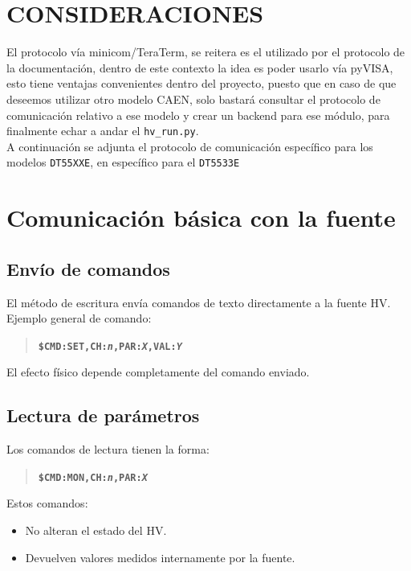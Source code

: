 \documentclass{article}
\begin{document}
\section{CONSIDERACIONES}

El protocolo vía minicom/TeraTerm, se reitera es el utilizado por el protocolo de la documentación, dentro de este contexto la idea es poder usarlo vía pyVISA, esto tiene ventajas convenientes dentro del proyecto, puesto que en caso de que deseemos utilizar otro modelo CAEN, solo bastará consultar el protocolo de comunicación relativo a ese modelo y crear un backend para ese módulo, para finalmente echar a andar el \texttt{hv\_run.py}.\\

A continuación se adjunta el protocolo de comunicación específico para los modelos \texttt{DT55XXE}, en específico para el \texttt{DT5533E}

\section{Comunicación básica con la fuente}

\subsection{Envío de comandos}

El método de escritura envía comandos de texto directamente a la fuente HV.  
Ejemplo general de comando:

\begin{quote}
\textbf{\texttt{\$CMD:SET,CH:\emph{n},PAR:\emph{X},VAL:\emph{Y}}}
\end{quote}

El efecto físico depende completamente del comando enviado.

\subsection{Lectura de parámetros}

Los comandos de lectura tienen la forma:

\begin{quote}
\textbf{\texttt{\$CMD:MON,CH:\emph{n},PAR:\emph{X}}}
\end{quote}

Estos comandos:
\begin{itemize}
    \item No alteran el estado del HV.
    \item Devuelven valores medidos internamente por la fuente.
\end{itemize}
\end{document}
